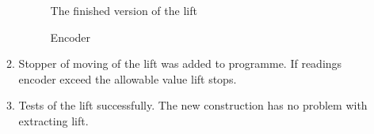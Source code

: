 \begin{enumerate}
\begin{enumerate}
      \begin{figure}[H]
      	\begin{minipage}[h]{0.47\linewidth}
      		\caption{The finished version of the lift}
      	\end{minipage}
      	\hfill
      	\begin{minipage}[h]{0.47\linewidth}
      		\caption{Encoder}
      	\end{minipage}
      \end{figure}
      
      \item Stopper of moving of the lift was added to programme. If readings encoder exceed the allowable value lift stops.
      
      \item Tests of the lift successfully. The new construction has no problem with extracting lift.
      

\end{enumerate}
\end{enumerate}
